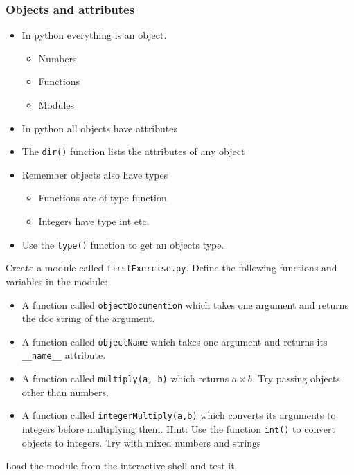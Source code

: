 \documentclass{beamer}
\begin{document}
\begin{frame}
\frametitle{Objects and attributes}
\begin{itemize}
\item In python everything is an object.
\begin{itemize}
\item Numbers
\item Functions
\item Modules
\end{itemize}
\item In python all objects have attributes
\item The \texttt{dir()} function lists the attributes of any object
\item Remember objects also have types
\begin{itemize}
\item Functions are of type function
\item Integers have type int etc.
\end{itemize}
\item Use the \texttt{type()} function to get an objects type.
\end{itemize}
\end{frame}

%

\begin{frame}
\begin{example}
Create a module called \texttt{firstExercise.py}.  Define the following functions and variables in the module:
\begin{itemize}
\item A function called \texttt{objectDocumention} which takes one argument and returns the doc string of the argument.
\item A function called \texttt{objectName} which takes one argument and returns its \texttt{\_\_name\_\_} attribute.
\item A function called \texttt{multiply(a, b)} which returns $a\times b$. Try passing objects other than numbers.
\item A function called \texttt{integerMultiply(a,b)} which converts its arguments to integers before multiplying them. Hint: Use the function \texttt{int()} to convert objects to integers. Try with mixed numbers and strings
\end{itemize}
Load the module from the interactive shell and test it. 
\end{example}
\end{frame}
\end{document}
